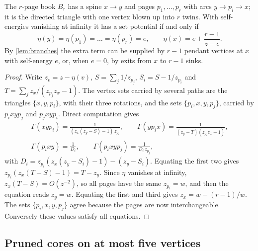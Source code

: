\begin{theorem}[books]\label{thm:books}
The $r$-page book $B_r$ has a spine $x\to y$ and pages $p_1,\dots,p_r$ with arcs $y\to p_i\to x$; it is the directed triangle with one vertex blown up into $r$ twins. With self-energies vanishing at infinity it has a set potential if and only if
\[
\eta(y)=\eta(p_1)=\dots=\eta(p_r)=e,\qquad \eta(x)=e+\frac{r-1}{z-e}.
\]
By \cref{lem:branches} the extra term can be supplied by $r-1$ pendant vertices at $x$ with self-energy $e$, or, when $e=0$, by exits from $x$ to $r-1$ sinks.
\end{theorem}
\begin{proof}
Write $z_v=z-\eta(v)$, $S=\sum_j1/z_{p_j}$, $S_i=S-1/z_{p_i}$ and $T=\sum_jz_x/(z_{p_j}z_x-1)$. The vertex sets carried by several paths are the triangles $\{x,y,p_i\}$, with their three rotations, and the sets $\{p_i,x,y,p_j\}$, carried by $p_ixyp_j$ and $p_jxyp_i$. Direct computation gives
\begin{gather*}
\Gamma(xyp_i)=\frac{1}{(z_x(z_y-S)-1)\,z_{p_i}},\qquad \Gamma(yp_ix)=\frac{1}{(z_y-T)(z_{p_i}z_x-1)},\\
\Gamma(p_ixy)=\frac{1}{D_i},\qquad \Gamma(p_ixyp_j)=\frac{1}{D_i\,z_{p_j}},
\end{gather*}
with $D_i=z_{p_i}(z_x(z_y-S_i)-1)-(z_y-S_i)$. Equating the first two gives $z_{p_i}(z_x(T-S)-1)=T-z_y$. Since $\eta$ vanishes at infinity, $z_x(T-S)=O(z^{-2})$, so all pages have the same $z_{p_i}=w$, and then the equation reads $z_y=w$. Equating the first and third gives $z_x=w-(r-1)/w$. The sets $\{p_i,x,y,p_j\}$ agree because the pages are now interchangeable. Conversely these values satisfy all equations.
\end{proof}

\subsection{Pruned cores on at most five vertices}

